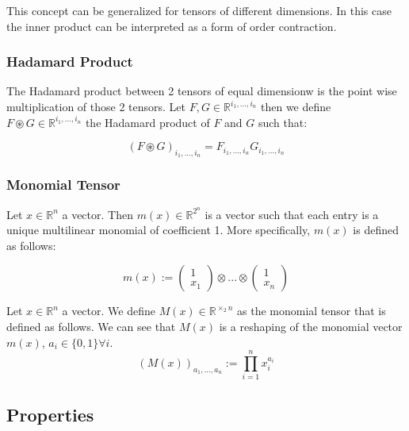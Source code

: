 \documentclass{article}
\begin{document}
This concept can be generalized for tensors of different dimensions. 
In this case the inner product can be interpreted as a form of order contraction.

\subsubsection*{Hadamard Product}

The Hadamard product between 2 tensors of equal dimensionw is the 
point wise multiplication of those 2 tensors. 
Let $F,G \in \mathbb{R}^{i_1,...,i_n}$ then we define $F\circledast G \in \mathbb{R}^{i_1,...,i_n}$
the Hadamard product of $F$ and $G$ such that:

\begin{equation}
    (F\circledast G )_{i_1,...,i_n} = F_{i_1,...,i_n}G_{i_1,...,i_n}
\end{equation}

\subsubsection*{Monomial Tensor}

Let $x \in \mathbb{R}^n$ a vector. Then $m(x) \in \mathbb{R}^{2^n}$ is a vector 
such that each entry is a unique multilinear monomial of coefficient 1.
More specifically, $m(x)$ is defined as follows:

\begin{equation}
    m(x) := \begin{pmatrix}
        1 \\
        x_1
    \end{pmatrix}
    \otimes ... \otimes
    \begin{pmatrix}
        1 \\
        x_n
    \end{pmatrix}
\end{equation}

Let $x \in \mathbb{R}^n$ a vector. We define $M(x) \in \mathbb{R}^{\times_2 n}$ as the monomial 
tensor that is defined as follows. We can see that $M(x)$ is a reshaping of the monomial vector
$m(x)$, $a_i \in \{0,1\} \forall i$.
\begin{equation}
    (M(x))_{a_1, ..., a_n} := \prod_{i=1}^{n} x_i^{a_i}
\end{equation}

\subsection{Properties}
\end{document}
